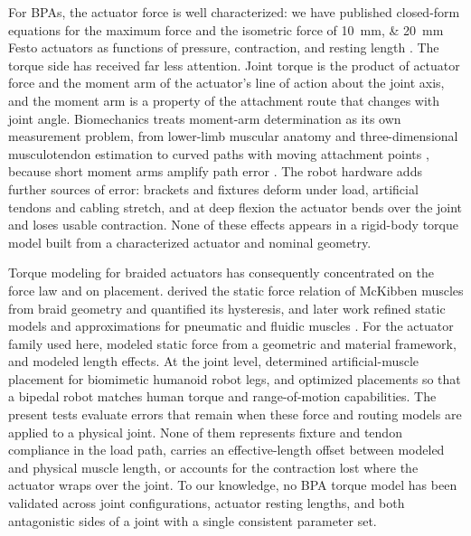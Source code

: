 \documentclass[utf8]{FrontiersinHarvard} %
\begin{document}
For BPAs, the actuator force is well characterized: we have published closed-form equations for the maximum force and the isometric force of \qtylist{10;20}{\mm} Festo actuators as functions of pressure, contraction, and resting length \citep{bolen_2026}. The torque side has received far less attention. Joint torque is the product of actuator force and the moment arm of the actuator's line of action about the joint axis, and the moment arm is a property of the attachment route that changes with joint angle. Biomechanics treats moment-arm determination as its own measurement problem, from lower-limb muscular anatomy \citep{brand_model_1982} and three-dimensional musculotendon estimation \citep{menegaldo_moment_2004} to curved paths with moving attachment points \citep{suderman_moving_2012}, because short moment arms amplify path error \citep{young_analyzing_2019}. The robot hardware adds further sources of error: brackets and fixtures deform under load, artificial tendons and cabling stretch, and at deep flexion the actuator bends over the joint and loses usable contraction. None of these effects appears in a rigid-body torque model built from a characterized actuator and nominal geometry.

Torque modeling for braided actuators has consequently concentrated on the force law and on placement. \citet{chou_measurement_1996} derived the static force relation of McKibben muscles from braid geometry and quantified its hysteresis, and later work refined static models and approximations for pneumatic and fluidic muscles \citep{tondu_static_2022, sarosi_new_2012}. For the actuator family used here, \citet{martens_modeling_2017} modeled static force from a geometric and material framework, and \citet{hunt_modeling_2017} modeled length effects. At the joint level, \citet{bolen_determination_2019} determined artificial-muscle placement for biomimetic humanoid robot legs, and \citet{morrow_optimization_2020} optimized placements so that a bipedal robot matches human torque and range-of-motion capabilities. The present tests evaluate errors that remain when these force and routing models are applied to a physical joint. None of them represents fixture and tendon compliance in the load path, carries an effective-length offset between modeled and physical muscle length, or accounts for the contraction lost where the actuator wraps over the joint. To our knowledge, no BPA torque model has been validated across joint configurations, actuator resting lengths, and both antagonistic sides of a joint with a single consistent parameter set.
\end{document}
